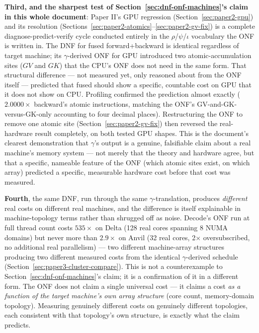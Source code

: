 \documentclass[11pt]{article}
\begin{document}
\textbf{Third, and the sharpest test of Section~\ref{sec:dnf-onf-machines}'s
claim in this whole document}: Paper II's GPU regression
(Section~\ref{sec:paper2-gpu}) and its resolution
(Sections~\ref{sec:paper2-atomics}--\ref{sec:paper2-gv-fix}) is a
complete diagnose-predict-verify cycle conducted entirely in the
$\rho$/$\psi$/$\iota$ vocabulary the ONF is written in. The DNF for
fused forward+backward is identical regardless of target machine; its
$\gamma$-derived ONF for GPU introduced two atomic-accumulation sites
($GV$ and $GK$) that the CPU's ONF does not need in the same form. That
structural difference --- not measured yet, only reasoned about from
the ONF itself --- predicted that fused should show a specific,
countable cost on GPU that it does not show on CPU. Profiling confirmed
the prediction almost exactly ($2.0000\times$ backward's atomic
instructions, matching the ONF's GV-and-GK-versus-GK-only accounting to
four decimal places). Restructuring the ONF to remove one atomic site
(Section~\ref{sec:paper2-gv-fix}) then reversed the real-hardware
result completely, on both tested GPU shapes. This is the document's
clearest demonstration that $\gamma$'s output is a genuine, falsifiable
claim about a real machine's memory system --- not merely that the
theory and hardware agree, but that a specific, nameable feature of the
ONF (which atomic sites exist, on which array) predicted a specific,
measurable hardware cost before that cost was measured.

\textbf{Fourth}, the same DNF, run through the same $\gamma$-translation,
produces \emph{different} real costs on different real machines, and
the difference is itself explainable in machine-topology terms rather
than shrugged off as noise. Decode's ONF run at full thread count
costs $535\times$ on Delta (128 real cores spanning 8 NUMA domains) but
never more than $2.9\times$ on Anvil (32 real cores, 2$\times$
oversubscribed, no additional real parallelism) --- two different
machine-array structures producing two different measured costs from
the identical $\gamma$-derived schedule
(Section~\ref{sec:paper3-cluster-compare}). This is not a
counterexample to Section~\ref{sec:dnf-onf-machines}'s claim; it is a
confirmation of it in a different form. The ONF does not claim a single
universal cost --- it claims a cost \emph{as a function of the target
machine's own array structure} (core count, memory-domain topology).
Measuring genuinely different costs on genuinely different topologies,
each consistent with that topology's own structure, is exactly what
the claim predicts.
\end{document}
